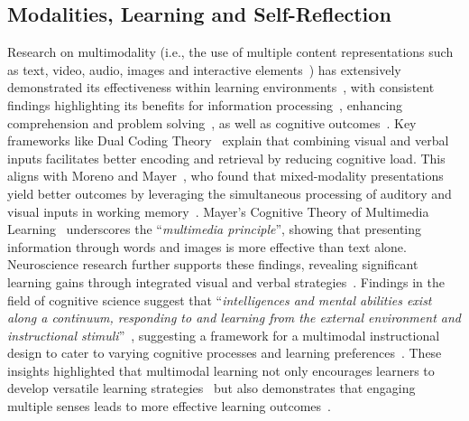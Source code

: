 \subsection{Modalities, Learning and Self-Reflection}
\label{sec: learning and reflection}
Research on multimodality (i.e., the use of multiple content representations such as text, video, audio, images and interactive elements~\cite{sankey2010engaging}) has extensively demonstrated its effectiveness within learning environments~\cite{mayer2005cambridge, birch2005students, williamson2010learning, sankey2009ethics, sankey2010engaging, pashler2008learning, miller2001learning, mestre2010matching, picciano2009blending, sankey2011impact, dolzhich2019multimodality, gargallo2018perceptual, borzello2018benefits, schwartz2014s}, with consistent findings highlighting its benefits for information processing~\cite{bartholomeus1972acquisition, birch1964auditory, lawton1973developmental}, enhancing comprehension and problem solving~\cite{sankey2010engaging, schroeder2013effective, fadel2008multimodal}, as well as cognitive outcomes~\cite{constantinidou2002stimulus}. Key frameworks like Dual Coding Theory~\cite{paivio1990mental, bodemer2002encouraging, mayer2002multimedia, sweller1988cognitive} explain that combining visual and verbal inputs facilitates better encoding and retrieval by reducing cognitive load. This aligns with Moreno and Mayer~\cite{moreno1999cognitive}, who found that mixed-modality presentations yield better outcomes by leveraging the simultaneous processing of auditory and visual inputs in working memory~\cite{paivio2013imagery}. Mayer’s Cognitive Theory of Multimedia Learning~\cite{mayer2005cambridge} underscores the ``\textit{multimedia principle}'', showing that presenting information through words and images is more effective than text alone. Neuroscience research further supports these findings, revealing significant learning gains through integrated visual and verbal strategies~\cite{fadel2008multimodal}. Findings in the field of cognitive science suggest that ``\textit{intelligences and mental abilities exist along a continuum, responding to and learning from the external environment and instructional stimuli}''~\cite{gardner2011frames}, suggesting a framework for a multimodal instructional design to cater to varying cognitive processes and learning preferences~\cite{picciano2009blending}. These insights highlighted that multimodal learning not only encourages learners to develop versatile learning strategies~\cite{hazari2004applying, picciano2009blending} but also demonstrates that engaging multiple senses leads to more effective learning outcomes~\cite{kearsley2000online}.

